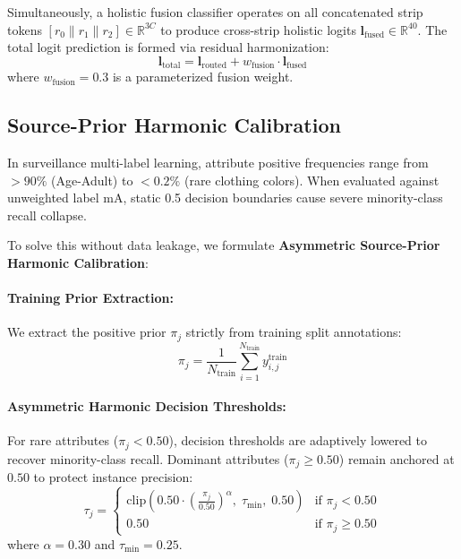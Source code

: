 Simultaneously, a holistic fusion classifier operates on all concatenated strip tokens $[r_0 \parallel r_1 \parallel r_2] \in \mathbb{R}^{3C}$ to produce cross-strip holistic logits $\mathbf{l}_{\mathrm{fused}} \in \mathbb{R}^{40}$. The total logit prediction is formed via residual harmonization:
\begin{equation}
    \mathbf{l}_{\mathrm{total}} = \mathbf{l}_{\mathrm{routed}} + w_{\mathrm{fusion}} \cdot \mathbf{l}_{\mathrm{fused}}
\end{equation}
where $w_{\mathrm{fusion}} = 0.3$ is a parameterized fusion weight.

\subsection{Source-Prior Harmonic Calibration}
In surveillance multi-label learning, attribute positive frequencies range from $>90\%$ (Age-Adult) to $<0.2\%$ (rare clothing colors). When evaluated against unweighted label mA, static 0.5 decision boundaries cause severe minority-class recall collapse.

To solve this without data leakage, we formulate \textbf{Asymmetric Source-Prior Harmonic Calibration}:
\paragraph{Training Prior Extraction:}
We extract the positive prior $\pi_j$ strictly from training split annotations:
\begin{equation}
    \pi_j = \frac{1}{N_{\mathrm{train}}} \sum_{i=1}^{N_{\mathrm{train}}} y_{i,j}^{\mathrm{train}}
\end{equation}

\paragraph{Asymmetric Harmonic Decision Thresholds:}
For rare attributes ($\pi_j < 0.50$), decision thresholds are adaptively lowered to recover minority-class recall. Dominant attributes ($\pi_j \ge 0.50$) remain anchored at $0.50$ to protect instance precision:
\begin{equation}
    \tau_j = \begin{cases}
        \mathrm{clip}\left( 0.50 \cdot \left(\frac{\pi_j}{0.50}\right)^\alpha, \; \tau_{\min}, \; 0.50 \right) & \text{if } \pi_j < 0.50 \\
        0.50 & \text{if } \pi_j \ge 0.50
    \end{cases}
    \label{eq:asymmetric_thresh}
\end{equation}
where $\alpha = 0.30$ and $\tau_{\min} = 0.25$.

